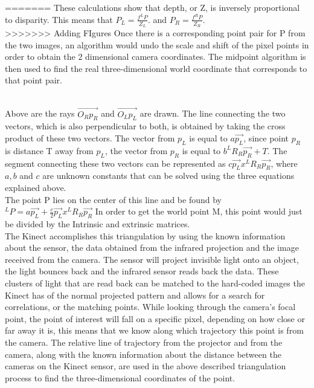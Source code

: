 \documentclass[12pt,twocolumn]{article}
\begin{document}
=======
These calculations show that depth, or Z, is inversely proportional to disparity. This means that  $P_{L}= \frac{f^{L}P}{Z_{L}}. $ and $P_{R}= \frac{f^{R}P}{Z_{R}}. $ \\ 
>>>>>>> Adding FIgures
\indent Once there is a corresponding point pair for P from the two images, an algorithm would undo the scale and shift of the pixel points in order to obtain the 2 dimensional camera coordinates. The midpoint algorithm is then used to find the real three-dimensional world coordinate that corresponds to that point pair.\\ 
  \\
\indent Above are the rays $\vec{O_{R}p_{R}}$ and $\vec{O_{L}p_{L}}$ are drawn. The line connecting the two vectors, which is also perpendicular to both, is obtained by taking the cross product of these two vectors. The vector from $p_{L}$ is equal to $a\vec{p_{L}}$, since point $p_{R}$ is distance T away from $p_{L}$, the vector from $p_{R}$ is equal to $b^{L}R_{R}\vec{p_{R}}+T$. The segment connecting these two vectors can be represented as $c\vec{p_{L}}x^{L}R_{R}\vec{p_{R}}$, where $a,b$ and $c$ are unknown constants that can be solved using the three equations explained above. \\
The point P lies on the center of this line and be found by $^{L}P=a\vec{p_{L}}+\frac{c}{2}\vec{p_{L}}x^{L}R_{R}\vec{p_{R}}$ In order to get the world point M, this point would just be divided by the Intrinsic and extrinsic matrices.\\


\indent  The Kinect accomplishes this triangulation by using the known information about the sensor, the data obtained from the infrared projection and the image received from the camera. The sensor will project invisible light onto an object, the light bounces back and the infrared sensor reads back the data. These clusters of light that are read back can be matched to the hard-coded images the Kinect has of the normal projected pattern and allows for a search for correlations, or the matching points. While looking through the camera's focal point, the point of interest will fall on a specific pixel, depending on how close or far away it is, this means that we know along which trajectory this point is from the camera. The relative line of trajectory from the projector and from the camera, along with the known information about the distance between the cameras on the Kinect sensor, are used in the above described triangulation process to find the three-dimensional coordinates of the point. \\
\end{document}
